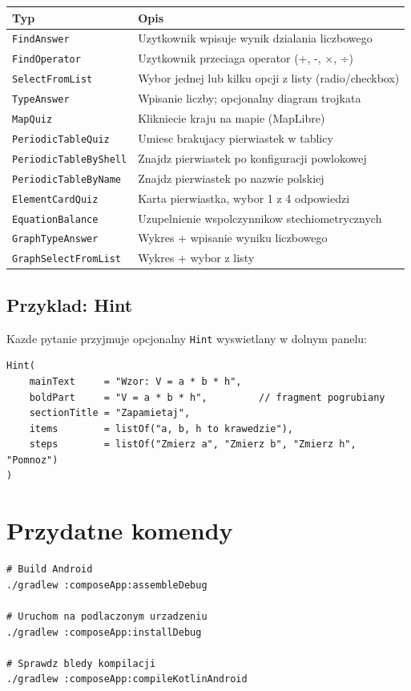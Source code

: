 \documentclass[a4paper,11pt]{article}
\begin{document}
\begin{center}
\renewcommand{\arraystretch}{1.25}
\begin{tabular}{lp{8cm}}
\textbf{Typ} & \textbf{Opis} \\
\hline
\texttt{FindAnswer}         & Uzytkownik wpisuje wynik dzialania liczbowego \\
\texttt{FindOperator}       & Uzytkownik przeciaga operator (+, -, ×, ÷) \\
\texttt{SelectFromList}     & Wybor jednej lub kilku opcji z listy (radio/checkbox) \\
\texttt{TypeAnswer}         & Wpisanie liczby; opcjonalny diagram trojkata \\
\texttt{MapQuiz}            & Klikniecie kraju na mapie (MapLibre) \\
\texttt{PeriodicTableQuiz}  & Umiesc brakujacy pierwiastek w tablicy \\
\texttt{PeriodicTableByShell} & Znajdz pierwiastek po konfiguracji powlokowej \\
\texttt{PeriodicTableByName}  & Znajdz pierwiastek po nazwie polskiej \\
\texttt{ElementCardQuiz}    & Karta pierwiastka, wybor 1 z 4 odpowiedzi \\
\texttt{EquationBalance}    & Uzupelnienie wspolczynnikow stechiometrycznych \\
\texttt{GraphTypeAnswer}    & Wykres + wpisanie wyniku liczbowego \\
\texttt{GraphSelectFromList}& Wykres + wybor z listy \\
\end{tabular}
\end{center}

\subsection{Przyklad: Hint}

Kazde pytanie przyjmuje opcjonalny \texttt{Hint} wyswietlany w dolnym panelu:

\begin{lstlisting}
Hint(
    mainText     = "Wzor: V = a * b * h",
    boldPart     = "V = a * b * h",         // fragment pogrubiany
    sectionTitle = "Zapamietaj",
    items        = listOf("a, b, h to krawedzie"),
    steps        = listOf("Zmierz a", "Zmierz b", "Zmierz h", "Pomnoz")
)
\end{lstlisting}

\section{Przydatne komendy}

\begin{lstlisting}[language={}]
# Build Android
./gradlew :composeApp:assembleDebug

# Uruchom na podlaczonym urzadzeniu
./gradlew :composeApp:installDebug

# Sprawdz bledy kompilacji
./gradlew :composeApp:compileKotlinAndroid
\end{lstlisting}
\end{document}
